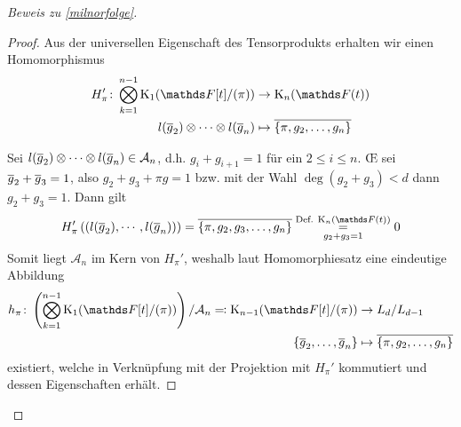 \documentclass[ngerman,fontsize=11pt, paper=a4, parskip=half, titlepage=true, toc=bib]{scrartcl}
\begin{document}
\begin{proof}[Beweis zu \ref{milnorfolge}]
\begin{proof}
    Aus der universellen Eigenschaft des Tensorprodukts erhalten wir
    einen Homomorphismus
    \begin{align*}
      H_\pi'\colon\bigotimes_{k=1}^{n-1}\K_1(\Ftpi)
      &\to\KnFt\\
      l(\ov g_2)\otimes\dotsb\otimes l(\ov g_n)
      &\mapsto \ov{\{\pi,g_2,\dotsc,g_n\}}
    \end{align*}
    
    Sei $l(\overline g_2)\otimes\dotsb\otimes l(\overline g_n)\in\mathcal{A}_n$,
    d.h. $g_i+g_{i+1}=1$ für ein $2\leq i\leq n$.
    \OE{} sei $\overline g_2 + \overline g_3=1$, 
    also $g_2 + g_3 +\pi g=1$ bzw. mit der Wahl
    $\deg(g_2+g_3)<d$ dann $g_2+g_3=1$. Dann gilt
    \begin{gather*}
      H'_\pi\left(\left(l(\ov g_2),\dotsb,l(\ov g_n)\right)\right)
      = \ov{\{\pi,g_2,g_3, \dotsc,g_n\}}
      \overset{\text{Def. $\KnFt$}}{\underset{g_2+g_3=1}{=}} 0
    \end{gather*}
    Somit liegt $\mathcal{A}_n$ im Kern von $H_\pi'$, weshalb laut
    Homomorphiesatz eine eindeutige Abbildung
    \begin{align*}
      h_\pi\colon 
      \left(\bigotimes_{k=1}^{n-1}\K_1(\Ftpi)\right)/\mathcal{A}_n
      \eqqcolon \K_{n-1}(\Ftpi)&\to L_d/L_{d-1}\\
      \{\ov g_2,\dotsc,\ov g_n\}&\mapsto \ov{\{\pi,g_2,\dotsc,g_n\}}
    \end{align*}
    existiert, welche in Verknüpfung mit der Projektion mit 
    $H_\pi'$ kommutiert und dessen Eigenschaften erhält.
    
    

\end{proof}
\end{proof}
\end{document}
